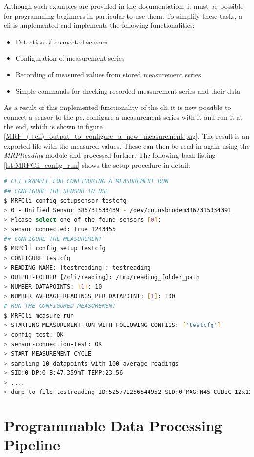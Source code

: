 Although such examples are provided in the documentation, it must be
possible for programming beginners in particular to use them. To
simplify these tasks, a \gls{cli} is implemented and implements the
following functionalities:

\begin{itemize}
\tightlist
\item
  Detection of connected sensors
\item
  Configuration of measurement series
\item
  Recording of measured values from stored measurement series
\item
  Simple commands for checking recorded measurement series and their
  data
\end{itemize}

As a result of this implemented functionality of the \gls{cli}, it is
now possible to connect a sensor to the \gls{pc}, configure a
measurement series with it and run it at the end, which is shown in
figure \ref{MRP_(+cli)_output_to_configure_a_new_measurement.png}. The
result is an exported file with the measured values. These can then be
read in again using the \emph{MRPReading} module and processed further.
The following bash listing \ref{lst:MRPCli_config_run} shows the setup
procedure in detail:

\begin{lstlisting}[language=bash, caption={MRPCli example usage for configuration of a measurement run}, label=lst:MRPCli_config_run]
# CLI EXAMPLE FOR CONFIGURING A MEASUREMENT RUN
## CONFIGURE THE SENSOR TO USE
$ MRPCli config setupsensor testcfg
> 0 - Unified Sensor 386731533439 - /dev/cu.usbmodem3867315334391
> Please select one of the found sensors [0]:
> sensor connected: True 1243455
## CONFIGURE THE MEASUREMENT
$ MRPCli config setup testcfg
> CONFIGURE testcfg
> READING-NAME: [testreading]: testreading
> OUTPUT-FOLDER [/cli/reading]: /tmp/reading_folder_path
> NUMBER DATAPOINTS: [1]: 10
> NUMBER AVERAGE READINGS PER DATAPOINT: [1]: 100
# RUN THE CONFIGURED MEASUREMENT
$ MRPCli measure run
> STARTING MEASUREMENT RUN WITH FOLLOWING CONFIGS: ['testcfg']
> config-test: OK
> sensor-connection-test: OK
> START MEASUREMENT CYCLE
> sampling 10 datapoints with 100 average readings
> SID:0 DP:0 B:47.359mT TEMP:23.56
> ....
> dump_to_file testreading_ID:525771256544952_SID:0_MAG:N45_CUBIC_12x12x12mm.mag.json
\end{lstlisting}

\hypertarget{programmable-data-processing-pipeline}{%
\section{Programmable Data Processing
Pipeline}\label{programmable-data-processing-pipeline}}

